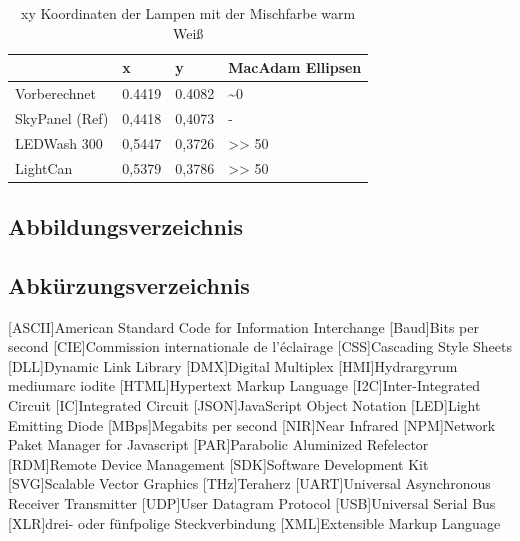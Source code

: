 \documentclass[11pt]{scrartcl}
\begin{document}
\noindent
\begin{table}[H]
    \begin{tabularx}{\textwidth}{|X|X|X|X|}
        \hline           & x        & y        & MacAdam Ellipsen\\\hline
        Vorberechnet     & 0.4419   & 0.4082   & \textasciitilde 0\\\hline
        SkyPanel (Ref)   & 0,4418   & 0,4073   & -\\\hline
        LEDWash 300      & 0,5447   & 0,3726   & >> 50\\\hline
        LightCan         & 0,5379   & 0,3786   & >> 50\\\hline
    \end{tabularx}
    \caption{xy Koordinaten der Lampen mit der Mischfarbe warm Weiß}
\end{table}
\clearpage

\subsection{Abbildungsverzeichnis}
\begingroup
\renewcommand{\section}[2]{}
\listoffigures
\endgroup
\clearpage

\subsection{Abkürzungsverzeichnis}
\begin{acronym}
    [ASCII]{American Standard Code for Information Interchange}
    [Baud]{Bits per second}
    [CIE]{Commission internationale de l’éclairage}
    [CSS]{Cascading Style Sheets}
    [DLL]{Dynamic Link Library}
    [DMX]{Digital Multiplex}
    [HMI]{Hydrargyrum mediumarc iodite}
    [HTML]{Hypertext Markup Language}
    [I2C]{Inter-Integrated Circuit}
    [IC]{Integrated Circuit}
    [JSON]{JavaScript Object Notation}
    [LED]{Light Emitting Diode}
    [MBps]{Megabits per second}
    [NIR]{Near Infrared}
    [NPM]{Network Paket Manager for Javascript}
    [PAR]{Parabolic Aluminized Refelector}
    [RDM]{Remote Device Management}
    [SDK]{Software Development Kit}
    [SVG]{Scalable Vector Graphics}
    [THz]{Teraherz}
    [UART]{Universal Asynchronous Receiver Transmitter}
    [UDP]{User Datagram Protocol}
    [USB]{Universal Serial Bus}
    [XLR]{drei- oder fünfpolige Steckverbindung}
    [XML]{Extensible Markup Language}
\end{acronym}
\clearpage
\end{document}
